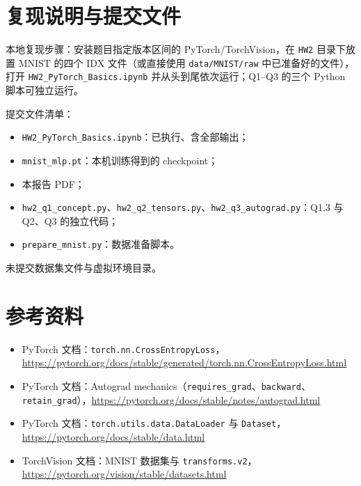 \documentclass[11pt,a4paper]{ctexart}
\begin{document}
\section{复现说明与提交文件}

本地复现步骤：安装题目指定版本区间的 PyTorch/TorchVision，在 \texttt{HW2} 目录下放置 MNIST 的四个 IDX 文件（或直接使用 \texttt{data/MNIST/raw} 中已准备好的文件），打开 \texttt{HW2\_PyTorch\_Basics.ipynb} 并从头到尾依次运行；Q1--Q3 的三个 Python 脚本可独立运行。

提交文件清单：
\begin{itemize}[itemsep=1pt,topsep=2pt]
\item \texttt{HW2\_PyTorch\_Basics.ipynb}：已执行、含全部输出；
\item \texttt{mnist\_mlp.pt}：本机训练得到的 checkpoint；
\item 本报告 PDF；
\item \texttt{hw2\_q1\_concept.py}、\texttt{hw2\_q2\_tensors.py}、\texttt{hw2\_q3\_autograd.py}：Q1.3 与 Q2、Q3 的独立代码；
\item \texttt{prepare\_mnist.py}：数据准备脚本。
\end{itemize}
未提交数据集文件与虚拟环境目录。

\section*{参考资料}
\begin{itemize}[itemsep=1pt,topsep=2pt]
\item PyTorch 文档：\texttt{torch.nn.CrossEntropyLoss}，\url{https://pytorch.org/docs/stable/generated/torch.nn.CrossEntropyLoss.html}
\item PyTorch 文档：Autograd mechanics（\texttt{requires\_grad}、\texttt{backward}、\texttt{retain\_grad}），\url{https://pytorch.org/docs/stable/notes/autograd.html}
\item PyTorch 文档：\texttt{torch.utils.data.DataLoader} 与 \texttt{Dataset}，\url{https://pytorch.org/docs/stable/data.html}
\item TorchVision 文档：MNIST 数据集与 \texttt{transforms.v2}，\url{https://pytorch.org/vision/stable/datasets.html}
\end{itemize}
\end{document}
